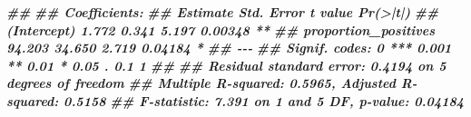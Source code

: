 \documentclass[
  11pt,
  oneside]{book}
\newenvironment{Shaded}{\begin{snugshade}}{\end{snugshade}}
\newcommand{\DocumentationTok}[1]{\textcolor[rgb]{0.56,0.35,0.01}{\textbf{\textit{#1}}}}
\begin{document}
\begin{Shaded}
\begin{Highlighting}[]
\DocumentationTok{\#\# }
\DocumentationTok{\#\# Coefficients:}
\DocumentationTok{\#\#                      Estimate Std. Error t value Pr(\textgreater{}|t|)   }
\DocumentationTok{\#\# (Intercept)             1.772      0.341   5.197  0.00348 **}
\DocumentationTok{\#\# proportion\_positives   94.203     34.650   2.719  0.04184 * }
\DocumentationTok{\#\# {-}{-}{-}}
\DocumentationTok{\#\# Signif. codes:  0 \textquotesingle{}***\textquotesingle{} 0.001 \textquotesingle{}**\textquotesingle{} 0.01 \textquotesingle{}*\textquotesingle{} 0.05 \textquotesingle{}.\textquotesingle{} 0.1 \textquotesingle{} \textquotesingle{} 1}
\DocumentationTok{\#\# }
\DocumentationTok{\#\# Residual standard error: 0.4194 on 5 degrees of freedom}
\DocumentationTok{\#\# Multiple R{-}squared:  0.5965, Adjusted R{-}squared:  0.5158 }
\DocumentationTok{\#\# F{-}statistic: 7.391 on 1 and 5 DF,  p{-}value: 0.04184}


\end{Highlighting}
\end{Shaded}
\end{document}
